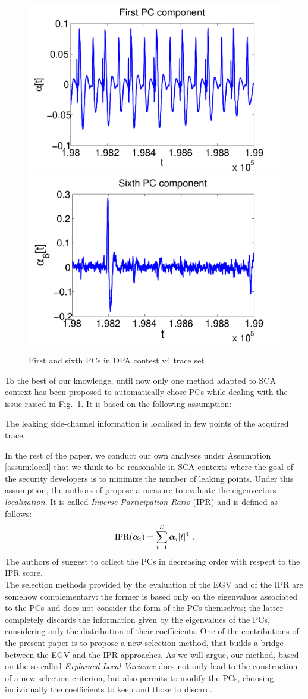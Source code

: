 \begin{figure}
\includegraphics[width=.45\textwidth]{figures/DPAcontestPC1.pdf} 
\includegraphics[width=.45\textwidth]{figures/DPAcontestPC6.pdf} 
\caption{First and sixth PCs in DPA contest v4 trace set}\label{fig:DPAcontest}
\end{figure}
To the best of our knowledge, until now only one method adapted to SCA context has been proposed to automatically chose PCs \cite{SCAclassProbl} while dealing with the issue raised in Fig.~\ref{fig:DPAcontest}. It is based on the following assumption:
\begin{assumption}\label{assum:local}
The leaking side-channel information is localised in few points of the acquired trace.
\end{assumption}
In the rest of the paper, we conduct our own analyses under Assumption \ref{assum:local} that we think to be reasonable in SCA contexts where the goal of the security developers is to minimize the number of leaking points.
Under this assumption, the authors of \cite{SCAclassProbl} propose a measure to evaluate the eigenvectors {\em localization}. It is called {\em Inverse Participation Ratio} (IPR) and is defined as follows:
\begin{equation}
\mathrm{IPR}(\boldsymbol\alpha_i) = \sum_{t=1}^D \boldsymbol\alpha_i[t]^4 \mbox{ .}
\end{equation}
The authors of \cite{SCAclassProbl} suggest to collect the PCs in decreasing order with respect to the IPR score.\\

The selection methods provided by the evaluation of the EGV and of the IPR are somehow complementary: the former is based only on the eigenvalues associated to the PCs and does not consider the form of the PCs themselves; the latter completely discards the information given by the eigenvalues of the PCs, considering only the distribution of their coefficients. One of the contributions of the present paper is to propose a new selection method, that builds a bridge between the EGV and the IPR approaches. As we will argue, our method, based on the so-called {\em Explained Local Variance} does not only lead to the construction of a new selection criterion, but also permits  to modify the PCs, choosing individually the coefficients to keep and those to discard. 


